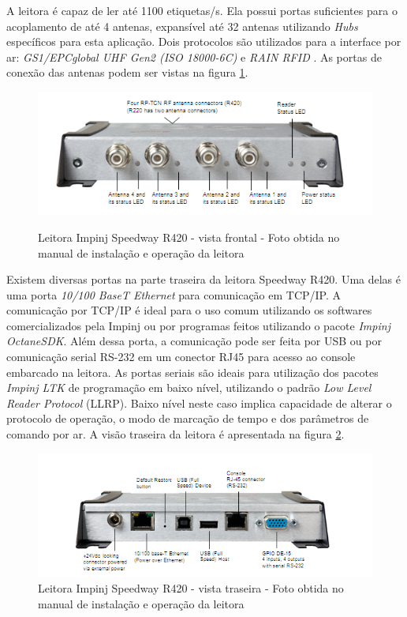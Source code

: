  A leitora é capaz de ler até 1100 etiquetas/s. Ela possui portas suficientes para o acoplamento de até 4 antenas, expansível até 32 antenas utilizando \textit{Hubs} específicos para esta aplicação. Dois protocolos são utilizados para a interface por ar: \textit{GS1/EPCglobal UHF Gen2 (ISO 18000-6C)} e \textit{RAIN RFID} \cite{SpeedwayRDatasheet}\cite{SpeedwayRUserManual}. As portas de conexão das antenas podem ser vistas na figura \ref{fig:SpeedwayR420front}.
 
     \begin{figure}[H]
        \centering
        \includegraphics[width=0.6\linewidth]{figs/Metodologia/SpeedwayR420-front-view.png}
        \caption{Leitora Impinj Speedway R420 - vista frontal - Foto obtida no manual de instalação e operação da leitora} \cite{SpeedwayRUserManual}
        \label{fig:SpeedwayR420front}
    \end{figure}
 
 Existem diversas portas na parte traseira da leitora Speedway R420. Uma delas é uma porta \textit{10/100 BaseT Ethernet} para comunicação em TCP/IP. A comunicação por TCP/IP é ideal para o uso comum utilizando os softwares comercializados pela Impinj ou por programas feitos utilizando o pacote \textit{Impinj OctaneSDK}. Além dessa porta, a comunicação pode ser feita por USB ou por comunicação serial RS-232 em um conector RJ45 para acesso ao console embarcado na leitora. As portas seriais são ideais para utilização dos pacotes \textit{Impinj LTK} de programação em baixo nível, utilizando o padrão \textit{Low Level Reader Protocol} (LLRP). Baixo nível neste caso implica capacidade de alterar o protocolo de operação, o modo de marcação de tempo e dos parâmetros de comando por ar\cite{GS1-LLRP}\cite{SpeedwayRUserManual}. A visão traseira da leitora é apresentada na figura \ref{fig:SpeedwayR420back}.
 
\begin{figure}[H]
    \centering
    \includegraphics[width=0.6\linewidth]{figs/Metodologia/SpeedwayR420-back-view.png}
    \caption{Leitora Impinj Speedway R420 - vista traseira - Foto obtida no manual de instalação e operação da leitora \cite{SpeedwayRUserManual}}
    \label{fig:SpeedwayR420back}
\end{figure}
 
